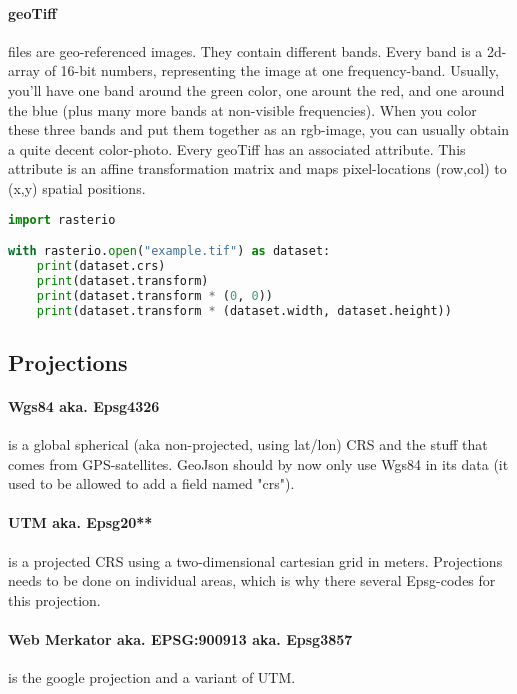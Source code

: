 \paragraph{geoTiff} files are geo-referenced images. They contain different bands. Every band is a 2d-array of 16-bit numbers, representing the image at one frequency-band. Usually, you'll have one band around the green color, one arount the red, and one around the blue (plus many more bands at non-visible frequencies). When you color these three bands and put them together as an rgb-image, you can usually obtain a quite decent color-photo. 
Every geoTiff has an associated  attribute. This attribute is an affine transformation matrix and maps pixel-locations (row,col) to (x,y) spatial positions.
\begin{lstlisting}[language=python]
import rasterio

with rasterio.open("example.tif") as dataset:
    print(dataset.crs)
    print(dataset.transform)
    print(dataset.transform * (0, 0))
    print(dataset.transform * (dataset.width, dataset.height))
\end{lstlisting}


\subsection{Projections}

\paragraph{Wgs84 aka. Epsg4326} is a global spherical (aka non-projected, using lat/lon) CRS and the stuff that comes from GPS-satellites. GeoJson should by now only  use Wgs84 in its data (it used to be allowed to add a field named "crs"). 
\paragraph{UTM aka. Epsg20**} is a projected CRS using a  two-dimensional cartesian grid in meters. Projections needs to be done on individual areas, which is why there several Epsg-codes for this projection.
\paragraph{Web Merkator aka. EPSG:900913 aka. Epsg3857} is the google projection and a variant of UTM.

